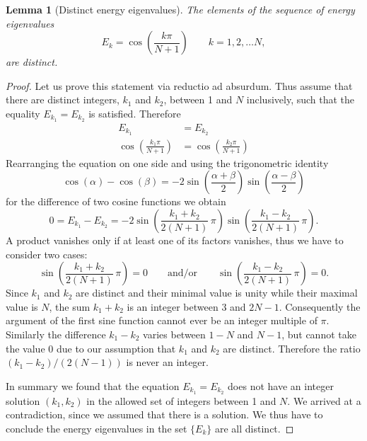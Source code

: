 \documentclass[a4paper, 10pt]{article}
\theoremstyle{plain}
\newtheorem{lemma}[]{Lemma}
\begin{document}
\begin{lemma}[Distinct energy eigenvalues]
    The elements of the sequence of energy eigenvalues
    \begin{equation*}
        E_{k} = \cos{\!\left ( \frac{k \pi}{N+1} \right )}
        \qquad k=1, 2, \dots N,
    \end{equation*}
    are distinct.
\end{lemma}
\begin{proof}
    Let us prove this statement via reductio ad absurdum. Thus assume that there
    are distinct integers, $k_{1}$ and $k_{2}$, between 1 and $N$ inclusively,
    such that the equality $E_{k_{1}} = E_{k_{2}}$ is satisfied. Therefore
    \begin{align*}
        E_{k_{1}}
        &=
        E_{k_{2}}
        \\
        \cos{\!\left ( \frac{k_{1} \pi}{N+1} \right )}
        &=
        \cos{\!\left ( \frac{k_{2} \pi}{N+1} \right )}
    \end{align*}
    Rearranging the equation on one side and using the trigonometric identity
    \begin{equation*}
        \cos{\!(\alpha)} - \cos{\!(\beta)}
        =
        -2 \sin{\!\left ( \frac{\alpha+\beta}{2} \right )}
        \sin{\!\left ( \frac{\alpha - \beta}{2} \right )}
    \end{equation*}
    for the difference of two cosine functions we obtain
    \begin{equation*}
        0
        =
        E_{k_{1}} - E_{k_{2}}
        =
        -2
        \sin{\!\left ( \frac{k_{1} + k_{2}}{2(N+1)} \,\pi\right )}
        \sin{\!\left ( \frac{k_{1} - k_{2}}{2(N+1)} \,\pi\right )}.
    \end{equation*}
    A product vanishes only if at least one of its factors vanishes, thus we
    have to consider two cases:
    \begin{equation*}
        \sin{\!\left ( \frac{k_{1} + k_{2}}{2(N+1)} \,\pi\right )} = 0
        \qquad \text{and/or} \qquad
        \sin{\!\left ( \frac{k_{1} - k_{2}}{2(N+1)} \,\pi\right )} = 0.
    \end{equation*}
    Since $k_{1}$ and $k_{2}$ are distinct and their minimal value is unity
    while their maximal value is $N$, the sum $k_{1}+k_{2}$ is an integer
    between $3$ and $2N-1$. Consequently the argument of the first sine function
    cannot ever be an integer multiple of $\pi$. Similarly the difference $k_{1}
    - k_{2}$ varies between $1-N$ and $N-1$, but cannot take the value $0$ due
    to our assumption that $k_{1}$ and $k_{2}$ are distinct. Therefore the ratio
    $(k_{1}-k_{2})/(2(N-1))$ is never an integer.

    In summary we found that the equation $E_{k_{1}} = E_{k_{2}}$ does not
    have an integer solution $(k_{1}, k_{2})$ in the allowed set of integers
    between 1 and $N$. We arrived at a contradiction, since we assumed that
    there is a solution. We thus have to conclude the energy eigenvalues in the
    set $\lbrace E_{k} \rbrace$ are all distinct.
\end{proof}
\end{document}
